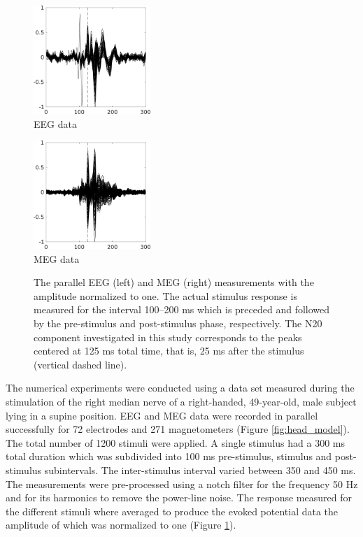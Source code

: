 \documentclass[5p]{elsarticle}
\begin{document}
\begin{figure}[h!]
\begin{footnotesize}
\begin{center}
\begin{minipage}{4.3cm} \begin{center}
\includegraphics[height=4.1cm]{eeg_data.png} \\ EEG data
\end{center}\end{minipage}
\begin{minipage}{4.3cm} \begin{center}
\includegraphics[height=4.1cm]{meg_data.png} \\ MEG data
\end{center}\end{minipage} 
\end{center}
\end{footnotesize}
\caption{The  parallel EEG (left) and MEG (right)  measurements with the amplitude normalized to one.  The actual stimulus response is measured for the interval  100--200 ms which is  preceded and followed by the pre-stimulus and post-stimulus phase, respectively. The N20 component investigated in this study corresponds to the peaks centered at 125 ms total time, that is, 25 ms after the stimulus (vertical dashed line). }
\label{fig:data} 
\end{figure}


The numerical experiments were conducted  using a data set measured during the stimulation of the right median nerve of a right-handed, 49-year-old, male subject lying in a supine position. EEG and MEG data were recorded in parallel successfully for 72 electrodes and 271 magnetometers (Figure \ref{fig:head_model}). The total number of 1200 stimuli were applied. A single stimulus had a 300 ms total duration which was subdivided into 100 ms pre-stimulus, stimulus and post-stimulus subintervals. The inter-stimulus interval varied between 350 and 450 ms. The measurements were pre-processed using a notch filter for the frequency 50 Hz and for its harmonics to remove the power-line noise. The response measured for the different stimuli where averaged to produce the evoked potential data the amplitude of which was normalized to one (Figure \ref{fig:data}).
\end{document}
